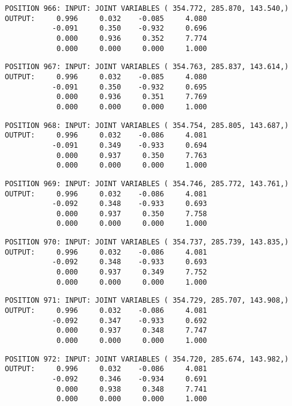 \begin{verbatim}
POSITION 966: INPUT: JOINT VARIABLES ( 354.772, 285.870, 143.540,)
OUTPUT:     0.996     0.032    -0.085     4.080
           -0.091     0.350    -0.932     0.696
            0.000     0.936     0.352     7.774
            0.000     0.000     0.000     1.000
\end{verbatim} \pagebreak[1]\begin{verbatim}
POSITION 967: INPUT: JOINT VARIABLES ( 354.763, 285.837, 143.614,)
OUTPUT:     0.996     0.032    -0.085     4.080
           -0.091     0.350    -0.932     0.695
            0.000     0.936     0.351     7.769
            0.000     0.000     0.000     1.000
\end{verbatim} \pagebreak[1]\begin{verbatim}
POSITION 968: INPUT: JOINT VARIABLES ( 354.754, 285.805, 143.687,)
OUTPUT:     0.996     0.032    -0.086     4.081
           -0.091     0.349    -0.933     0.694
            0.000     0.937     0.350     7.763
            0.000     0.000     0.000     1.000
\end{verbatim} \pagebreak[1]\begin{verbatim}
POSITION 969: INPUT: JOINT VARIABLES ( 354.746, 285.772, 143.761,)
OUTPUT:     0.996     0.032    -0.086     4.081
           -0.092     0.348    -0.933     0.693
            0.000     0.937     0.350     7.758
            0.000     0.000     0.000     1.000
\end{verbatim} \pagebreak[1]\begin{verbatim}
POSITION 970: INPUT: JOINT VARIABLES ( 354.737, 285.739, 143.835,)
OUTPUT:     0.996     0.032    -0.086     4.081
           -0.092     0.348    -0.933     0.693
            0.000     0.937     0.349     7.752
            0.000     0.000     0.000     1.000
\end{verbatim} \pagebreak[1]\begin{verbatim}
POSITION 971: INPUT: JOINT VARIABLES ( 354.729, 285.707, 143.908,)
OUTPUT:     0.996     0.032    -0.086     4.081
           -0.092     0.347    -0.933     0.692
            0.000     0.937     0.348     7.747
            0.000     0.000     0.000     1.000
\end{verbatim} \pagebreak[1]\begin{verbatim}
POSITION 972: INPUT: JOINT VARIABLES ( 354.720, 285.674, 143.982,)
OUTPUT:     0.996     0.032    -0.086     4.081
           -0.092     0.346    -0.934     0.691
            0.000     0.938     0.348     7.741
            0.000     0.000     0.000     1.000
\end{verbatim} \pagebreak[1]\begin{verbatim}

\end{verbatim}
